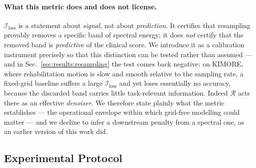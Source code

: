 \documentclass[10pt,journal]{IEEEtran}
\begin{document}
\paragraph{What this metric does and does not license.} $\mathcal{I}_{\text{loss}}$ is a statement
about \emph{signal}, not about \emph{prediction}. It certifies that resampling provably removes a
specific band of spectral energy; it does \emph{not} certify that the removed band is
\emph{predictive} of the clinical score. We introduce it as a calibration instrument precisely so that
this distinction can be tested rather than assumed --- and in Sec.~\ref{sec:results:resampling} the
test comes back negative: on KIMORE, where rehabilitation motion is slow and smooth relative to the
sampling rate, a fixed-grid baseline suffers a large $\mathcal{I}_{\text{loss}}$ and yet loses
essentially no accuracy, because the discarded band carries little task-relevant information. Indeed
$\mathcal{R}$ acts there as an effective \emph{denoiser}. We therefore state plainly what the metric
establishes --- the operational envelope within which grid-free modelling could matter --- and we
decline to infer a downstream penalty from a spectral one, as an earlier version of this work did.

\subsection{Experimental Protocol}
\label{sec:method:protocol}
\end{document}
